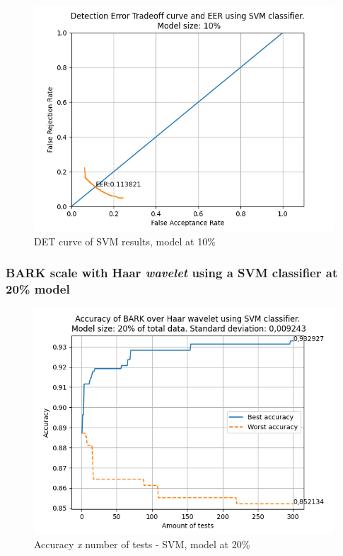 			\begin{figure}[H]
				\centering
				\includegraphics[scale=.6]{images/results/det/DET_SVM_10}
				\caption{DET curve of SVM results, model at 10\%}
				\label{fig:detsvm10}
			\end{figure}

			
		
		\subsubsection{BARK scale with Haar \textit{wavelet} using a SVM classifier at 20\% model}
			
			\begin{figure}[H]
				\centering
				\includegraphics[scale=.6]{images/results/confusionMatrices/classifier_SVM_20.png}
				\caption{Accuracy \textit{x} number of tests - SVM, model at 20\%}
				\label{fig:classifiersvm20}
			\end{figure}
			
